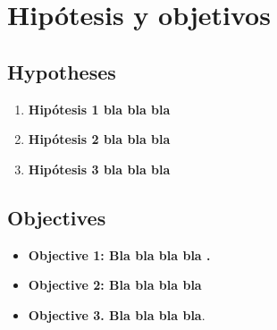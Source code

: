 \chapter[Hipótesis y objetivos]{Hipótesis y objetivos}
\label{cp:Hipótesis}

\section{Hypotheses}

\lipsum[1-1]


\begin{enumerate}[label=(\alph*)]

 \item  \textbf{Hipótesis 1 bla bla bla}

 \item \textbf{Hipótesis 2  bla bla bla}

 \item \textbf{Hipótesis 3  bla bla bla}

\end{enumerate}


\newpage


\section{Objectives}

\lipsum[1-1]

\begin{itemize}

\item \textbf{Objective 1: Bla bla bla bla .}  

\lipsum[1-1]

\item \textbf{Objective 2: Bla bla bla bla}  
 
\lipsum[1-1]

\item \textbf{Objective 3. Bla bla bla bla}. 

\lipsum[1-1]


\end{itemize}



